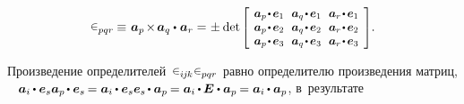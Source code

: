 \begin{otherlanguage}{russian}
\nopagebreak\vspace{-0.4em}
\begin{equation*}
\permutationsparitysymbols{pqr} \hspace{-0.15ex}
\equiv \hspace{.16ex} \bm{a}_p \hspace{-0.25ex} \times \hspace{-0.25ex} \bm{a}_q \dotp \hspace{.1ex} \bm{a}_r =
\hspace{.1ex} \pm \hspace{.1ex} \determinant\hspace{-0.1ex}
\scalebox{0.92}[0.92]{$\left[\hspace{-0.2ex}\begin{array}{c@{\hspace{.64em}}c@{\hspace{.64em}}c}
\bm{a}_p \narrowdotp\hspace{.12ex} \bm{e}_1 & \bm{a}_q \narrowdotp\hspace{.12ex} \bm{e}_1 & \bm{a}_r \narrowdotp\hspace{.12ex} \bm{e}_1 \\
\bm{a}_p \narrowdotp\hspace{.12ex} \bm{e}_2 & \bm{a}_q \narrowdotp\hspace{.12ex} \bm{e}_2 & \bm{a}_r \narrowdotp\hspace{.12ex} \bm{e}_2 \\
\bm{a}_p \narrowdotp\hspace{.12ex} \bm{e}_3 & \bm{a}_q \narrowdotp\hspace{.12ex} \bm{e}_3 & \bm{a}_r \narrowdotp\hspace{.12ex} \bm{e}_3
\end{array}\hspace{-0.12ex}\right]$} .
\end{equation*}

\vspace{.1em}\noindent
Произведение определителей~${\permutationsparitysymbols{i\hspace{-0.1ex}j\hspace{-0.1ex}k} \permutationsparitysymbols{pqr}}$
равно
определителю произведения матриц,
~\ru{\:---}
${\bm{a}_i \hspace{-0.1ex} \dotp \bm{e}_s \bm{a}_p \hspace{-0.2ex} \dotp \bm{e}_s \hspace{-0.2ex}
= \bm{a}_i \hspace{-0.1ex} \dotp \bm{e}_s \bm{e}_s \hspace{-0.2ex} \dotp \bm{a}_p \hspace{-0.15ex}
= \bm{a}_i \hspace{-0.1ex} \dotp \hspace{-0.1ex} \UnitDyad \dotp \bm{a}_p \hspace{-0.15ex}
= \bm{a}_i \hspace{-0.1ex} \dotp \bm{a}_p}$,
в~результате


\end{otherlanguage}

